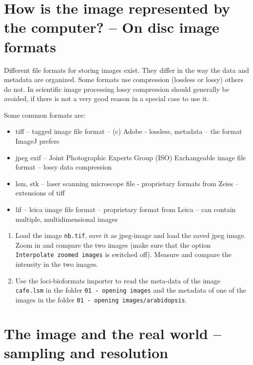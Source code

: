 \section{How is the image represented by the computer? -- On disc image formats}

Different file formats for storing images exist. They differ in the way the data and metadata are
organized. Some formats use compression (lossless or lossy) others do not. In scientific image
processing lossy compression should generally be avoided, if there is not a very good reason in a
special case to use it.

Some common formats are:

\begin{itemize}
\item tiff -- tagged image file format -- (c) Adobe - lossless, metadata -- the format ImageJ prefers
\item jpeg exif -- Joint Photographic Experts Group (ISO) Exchangeable image file format -- lossy data compression
\item lsm, stk -- laser scanning microscope file - proprietary formats from Zeiss -- extensions of tiff
\item lif -- leica image file format -- proprietary format from Leica -- can contain multiple, multidimensional images
\end{itemize}

\begin{enumerate}
\item Load the image \texttt{nb.tif}, save it as jpeg-image and load the saved jpeg image. Zoom in and compare the two images (make sure that the option \texttt{Interpolate zoomed images} is switched off). Measure and compare the intensity in the two images.

\fbox{
	\begin{minipage}{\linewidth}
		\hfill\vspace{1cm}
	\end{minipage}
	}
	
\item Use the loci-bioformats importer to read the meta-data of the image \texttt{cafe.lsm} in the folder \texttt{01 - opening images} and the metadata of one of the images in the folder \texttt{01 - opening images/arabidopsis}.
\end{enumerate}

\section{The image and the real world -- sampling and resolution}

